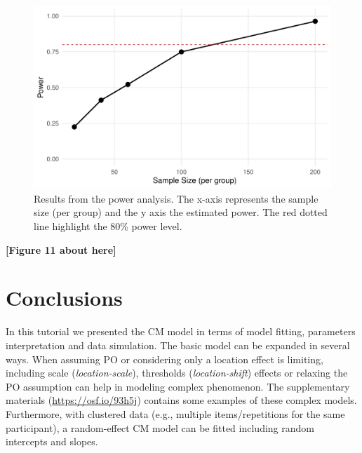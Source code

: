\documentclass[
  man,floatsintext]{apa6}
\begin{document}
\normalsize

\scriptsize

\begin{figure}

{\centering \includegraphics[width=1\linewidth]{paper_files/figure-latex/fig-power-curve-1} 

}

\caption{Results from the power analysis. The x-axis represents the sample size (per group) and the y axis the estimated power. The red dotted line highlight the 80\% power level.}\label{fig:fig-power-curve}
\end{figure}

\begin{center}\textbf{[Figure 11 about here]} \end{center}

\normalsize

\section{Conclusions}\label{conclusions}

In this tutorial we presented the CM model in terms of model fitting, parameters interpretation and data simulation. The basic model can be expanded in several ways. When assuming PO or considering only a location effect is limiting, including scale (\emph{location-scale}), thresholds (\emph{location-shift}) effects or relaxing the PO assumption can help in modeling complex phenomenon. The supplementary materials (\href{https://osf.io/93h5j/?view_only=33f262ee28374a88b935f0a25cefdb34}{https://osf.io/93h5j}) contains some examples of these complex models. Furthermore, with clustered data (e.g., multiple items/repetitions for the same participant), a random-effect CM model can be fitted including random intercepts and slopes.
\end{document}

